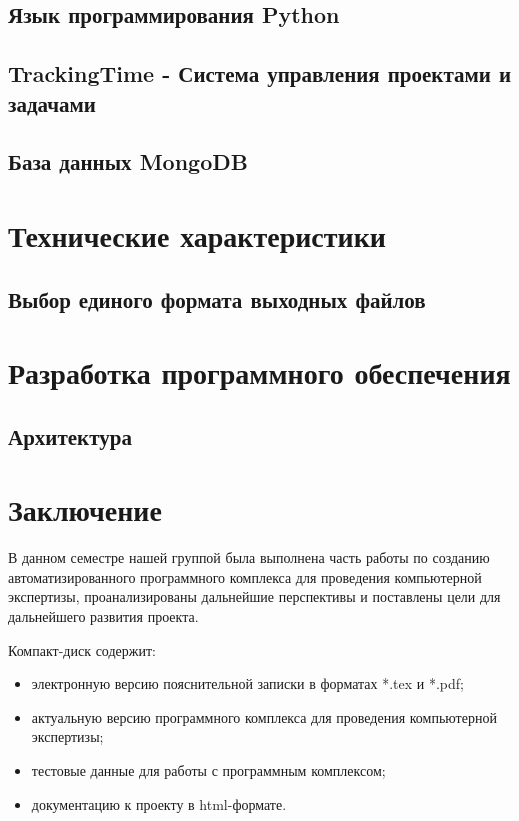 \subsection{Язык программирования Python}

\subsection{TrackingTime - Система управления проектами и задачами}

\subsection{База данных MongoDB}


\section{Технические характеристики}

\subsection{Выбор единого формата выходных файлов}


\section{Разработка программного обеспечения}
\setcounter{figure}{0}
 
\subsection{Архитектура}


\newpage
\section*{Заключение}
В данном семестре нашей группой была выполнена часть работы по созданию автоматизированного программного комплекса для проведения компьютерной экспертизы, проанализированы дальнейшие перспективы и поставлены цели для дальнейшего развития проекта.
 
 
 \newpage
 \renewcommand{\refname}{Список использованных источников}
 

 Компакт-диск содержит: 
 \begin{itemize}
 \item электронную версию пояснительной записки в форматах *.tex и *.pdf;
 \item актуальную версию программного комплекса для проведения компьютерной экспертизы;
 \item тестовые данные для работы с программным комплексом;
 \item документацию к проекту в html-формате.
 \end{itemize}
 


